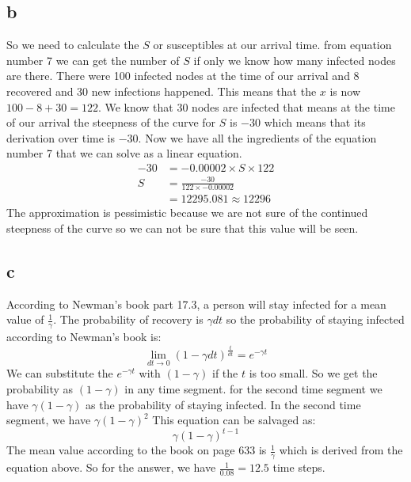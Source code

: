 \documentclass[a4paper, 11pt]{article}
\begin{document}
\subsection{b}
So we need to calculate the $S$ or susceptibles at our arrival time.
from equation number 7 we can get the number of $S$ if only we know how many
infected nodes are there. There were 100 infected nodes at the time of our
arrival and 8 recovered and 30 new infections happened. This means that the
$x$ is now $100 - 8 + 30 = 122$.
We know that 30 nodes are infected that means at the time of our arrival
the steepness of the curve for $S$ is $-30$ which means that its derivation
over time is $-30$. Now we have all the ingredients of the equation number 7
that we can solve as a linear equation.
\begin{equation}
    \begin{aligned}
        -30 &= -0.00002 \times S \times 122 \\
        S &= \frac{-30}{122 \times -0.00002} \\
        &= 12295.081 \approx 12296
    \end{aligned}
\end{equation}
The approximation is pessimistic because we are not sure of the continued
steepness of the curve so we can not be sure that this value will be seen.
\subsection{c}
According to Newman's book part 17.3, a person will stay infected for a mean
value of $\frac{1}{\gamma}$.
The probability of recovery is $\gamma dt$ so the probability of staying
infected according to Newman's book is:
\begin{equation}
    \lim_{dt \rightarrow 0} (1 - \gamma dt)^{\frac{t}{dt}} = e^{-\gamma t}
\end{equation}
We can substitute the $e^{-\gamma t}$ with $(1 - \gamma)$ if the $t$ is too
small.
So we get the probability as $(1- \gamma)$ in any time segment.
for the second time segment we have $\gamma(1- \gamma)$ as the probability of
staying infected. In the second time segment, we have $\gamma(1-\gamma)^2$
This equation can be salvaged as:
\begin{equation}
    \gamma(1-\gamma)^{t-1}
\end{equation}
The mean value according to the book on page 633 is $\frac{1}{\gamma}$ which
is derived from the equation above. So for the answer, we have
$\frac{1}{0.08} = 12.5$ time steps.
\end{document}
